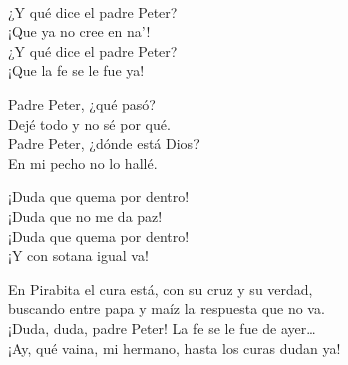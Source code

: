 \begin{lyrics}
\\
 ¿Y qué dice el padre Peter?\\
 ¡Que ya no cree en na'!\\
 ¿Y qué dice el padre Peter?\\
 ¡Que la fe se le fue ya!

 Padre Peter, ¿qué pasó?\\
 Dejé todo y no sé por qué.\\
 Padre Peter, ¿dónde está Dios?\\
 En mi pecho no lo hallé.

 ¡Duda que quema por dentro!\\
 ¡Duda que no me da paz!\\
 ¡Duda que quema por dentro!\\
 ¡Y con sotana igual va!

En Pirabita el cura está, con su cruz y su verdad,\\
buscando entre papa y maíz la respuesta que no va.\\
¡Duda, duda, padre Peter! La fe se le fue de ayer…\\
¡Ay, qué vaina, mi hermano, hasta los curas dudan ya!
\end{lyrics}

